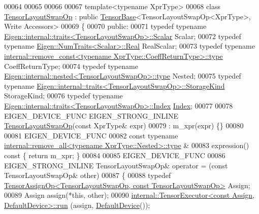 \begin{DoxyCode}
00064 
00065 
00066 
00067 \textcolor{keyword}{template}<\textcolor{keyword}{typename} XprType>
00068 \textcolor{keyword}{class }\hyperlink{class_eigen_1_1_tensor_layout_swap_op}{TensorLayoutSwapOp} : \textcolor{keyword}{public} \hyperlink{class_eigen_1_1_tensor_base}{TensorBase}<TensorLayoutSwapOp<XprType>, Write
      Accessors>
00069 \{
00070   \textcolor{keyword}{public}:
00071   \textcolor{keyword}{typedef} \textcolor{keyword}{typename} \hyperlink{struct_eigen_1_1internal_1_1traits}{Eigen::internal::traits<TensorLayoutSwapOp>::Scalar}
       Scalar;
00072   \textcolor{keyword}{typedef} \textcolor{keyword}{typename} \hyperlink{group___sparse_core___module}{Eigen::NumTraits<Scalar>::Real} RealScalar;
00073   \textcolor{keyword}{typedef} \textcolor{keyword}{typename} 
      \hyperlink{group___sparse_core___module}{internal::remove\_const<typename XprType::CoeffReturnType>::type}
       CoeffReturnType;
00074   \textcolor{keyword}{typedef} \textcolor{keyword}{typename} \hyperlink{class_eigen_1_1internal_1_1_tensor_lazy_evaluator_writable}{Eigen::internal::nested<TensorLayoutSwapOp>::type}
       Nested;
00075   \textcolor{keyword}{typedef} \textcolor{keyword}{typename} \hyperlink{struct_eigen_1_1internal_1_1traits}{Eigen::internal::traits<TensorLayoutSwapOp>::StorageKind}
       StorageKind;
00076   \textcolor{keyword}{typedef} \textcolor{keyword}{typename} \hyperlink{struct_eigen_1_1internal_1_1traits}{Eigen::internal::traits<TensorLayoutSwapOp>::Index}
       \hyperlink{namespace_eigen_a62e77e0933482dafde8fe197d9a2cfde}{Index};
00077 
00078   EIGEN\_DEVICE\_FUNC EIGEN\_STRONG\_INLINE \hyperlink{class_eigen_1_1_tensor_layout_swap_op}{TensorLayoutSwapOp}(\textcolor{keyword}{const} XprType& expr)
00079       : m\_xpr(expr) \{\}
00080 
00081     EIGEN\_DEVICE\_FUNC
00082     \textcolor{keyword}{const} \textcolor{keyword}{typename} \hyperlink{group___sparse_core___module}{internal::remove\_all<typename XprType::Nested>::type}
      &
00083     expression()\textcolor{keyword}{ const }\{ \textcolor{keywordflow}{return} m\_xpr; \}
00084 
00085     EIGEN\_DEVICE\_FUNC
00086     EIGEN\_STRONG\_INLINE TensorLayoutSwapOp& operator = (\textcolor{keyword}{const} TensorLayoutSwapOp& other)
00087     \{
00088       \textcolor{keyword}{typedef} \hyperlink{class_eigen_1_1_tensor_assign_op}{TensorAssignOp<TensorLayoutSwapOp, const TensorLayoutSwapOp>}
       Assign;
00089       Assign assign(*\textcolor{keyword}{this}, other);
00090       \hyperlink{class_eigen_1_1internal_1_1_tensor_executor}{internal::TensorExecutor<const Assign, DefaultDevice>::run}
      (assign, \hyperlink{struct_eigen_1_1_default_device}{DefaultDevice}());

\end{DoxyCode}
